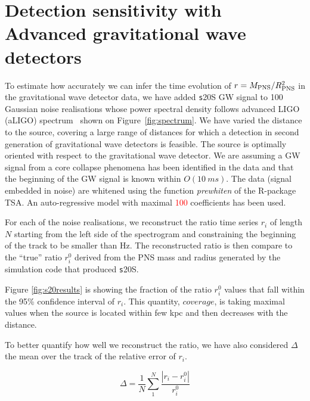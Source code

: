 \section{Detection sensitivity with Advanced gravitational wave detectors}
\label{sec:results}

To estimate how accurately we can infer the time evolution of $r=M_{\rm PNS}/R_{\rm PNS}^2$ in the
gravitational wave detector data, we have added {\texttt s20S} GW signal to 
100 Gaussian noise realisations whose power spectral density follows advanced LIGO (aLIGO)
spectrum~\cite{aLIGOsens:2018} shown on Figure~\ref{fig:spectrum}. 
We have varied the distance to the source, covering a large
range of distances for which a detection in second generation of gravitational wave detectors
is feasible. The source is optimally oriented with
respect to the gravitational wave detector. We are assuming a GW signal from a core collapse
phenomena has been identified in the data and that the beginning of the GW signal is known within $O(10~ms)$.
The data (signal embedded in noise) are whitened using the function {\it prewhiten} of the R-package TSA.
An auto-regressive model with maximal \textcolor{red}{100} coefficients has been used.    

For each of the noise realisations, we reconstruct the ratio time series {$r_i$}
of length $N$ starting from the left side of the spectrogram and constraining the beginning of the
track to be smaller than \unit[200]{Hz}. The reconstructed ratio is then compare to the ``true'' ratio
{$r_i^0$} derived from the PNS mass and radius generated by the simulation code that produced {\texttt s20S}.

Figure \ref{fig:s20results} is showing the fraction of the ratio {$r_i^0$} values that fall
within the 95\% confidence interval of {$r_i$}. This quantity, $coverage$, is taking maximal values
when the source is located within few kpc and then decreases with the distance.

To better quantify how well we reconstruct the ratio, we have also considered $\Delta$ the mean
over the track of the relative error of $r_i$. 

\begin{equation}
\Delta=\frac{1}{N}\sum_1^N\frac{|r_i-r_i^0|}{r_i^0}
\end{equation}

